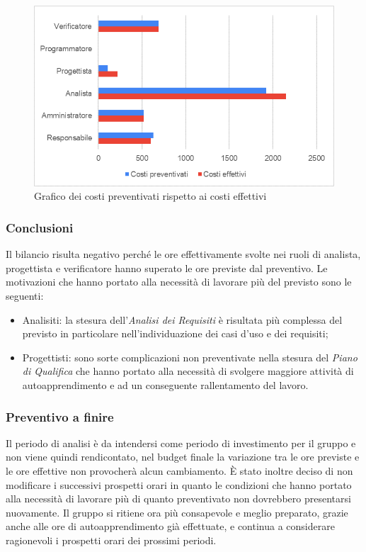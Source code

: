 	\begin{figure} [H]
		\includegraphics[width=\linewidth]{./img/Grafici/14.png}
		\caption{Grafico dei costi preventivati rispetto ai costi effettivi}
	\end{figure}

		\subsubsection{Conclusioni}
		Il bilancio risulta negativo perché le ore effettivamente svolte nei ruoli di analista, progettista e verificatore hanno superato le ore previste dal preventivo.
		Le motivazioni che hanno portato alla necessità di lavorare più del previsto sono le seguenti:
		\begin{itemize}
			\item Analisiti: la stesura dell'\textit{Analisi dei Requisiti} è risultata più complessa del previsto in particolare nell'individuazione dei casi d'uso e dei requisiti;
			\item Progettisti: sono sorte complicazioni non preventivate nella stesura del \textit{Piano di Qualifica} che hanno portato alla necessità di svolgere maggiore attività di autoapprendimento e ad un conseguente rallentamento del lavoro.
		\end{itemize}
		\subsubsection{Preventivo a finire}
		Il periodo di analisi è da intendersi come periodo di investimento per il gruppo e non viene quindi rendicontato, nel budget finale la variazione tra le ore previste e le ore effettive non provocherà alcun cambiamento. 
		È stato inoltre deciso di non modificare i successivi prospetti orari in quanto le condizioni che hanno portato alla necessità di lavorare più di quanto preventivato non dovrebbero presentarsi nuovamente. Il gruppo si ritiene ora più consapevole e meglio preparato, grazie anche alle ore di autoapprendimento già effettuate, e continua a considerare ragionevoli i prospetti orari dei prossimi periodi.
